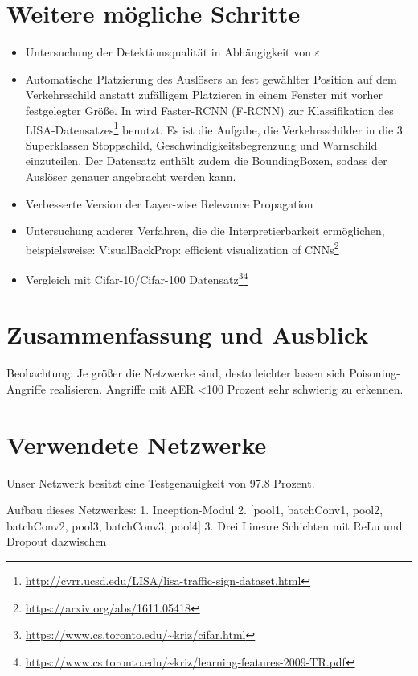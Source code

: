 \documentclass[11pt,a4paper]{article}
\numberwithin{equation}{section}
\begin{document}
	\section{Weitere mögliche Schritte} \label{chapter_weitereSchritte}
	\begin{itemize}
		\item Untersuchung der Detektionsqualität in Abhängigkeit von $\varepsilon$
		\item Automatische Platzierung des Auslösers an fest gewählter Position auf dem Verkehrsschild anstatt zufälligem Platzieren in einem Fenster mit vorher festgelegter Größe. In \cite{badnets} wird  Faster-RCNN (F-RCNN) zur Klassifikation des LISA-Datensatzes\footnote{\url{http://cvrr.ucsd.edu/LISA/lisa-traffic-sign-dataset.html}} benutzt. Es ist die Aufgabe, die Verkehrsschilder in die 3 Superklassen Stoppschild, Geschwindigkeitsbegrenzung und Warnschild einzuteilen. Der Datensatz enthält zudem die BoundingBoxen, sodass der Auslöser genauer angebracht werden kann.
		\item Verbesserte Version der Layer-wise Relevance Propagation
		\item Untersuchung anderer Verfahren, die die Interpretierbarkeit ermöglichen, beispielsweise: VisualBackProp: efficient visualization of CNNs\footnote{\url{https://arxiv.org/abs/1611.05418}}
		\item Vergleich mit Cifar-10/Cifar-100 Datensatz\footnote{\url{https://www.cs.toronto.edu/~kriz/cifar.html}}\footnote{\url{https://www.cs.toronto.edu/~kriz/learning-features-2009-TR.pdf}}
	\end{itemize}
	
	
	\section{Zusammenfassung und Ausblick} \label{chapter_conclusion}
	Beobachtung: Je größer die Netzwerke sind, desto leichter lassen sich Poisoning-Angriffe realisieren.
	Angriffe mit AER <100 Prozent sehr schwierig zu erkennen.
	
	
	\printglossaries
	\newpage
	\appendix
	\section{Verwendete Netzwerke}
	Unser Netzwerk besitzt eine Testgenauigkeit von 97.8 Prozent.
	
	Aufbau dieses Netzwerkes:
	1. Inception-Modul
	2. [pool1, batchConv1, pool2, batchConv2, pool3, batchConv3, pool4]
	3. Drei Lineare Schichten mit ReLu und Dropout dazwischen
	
\end{document}
